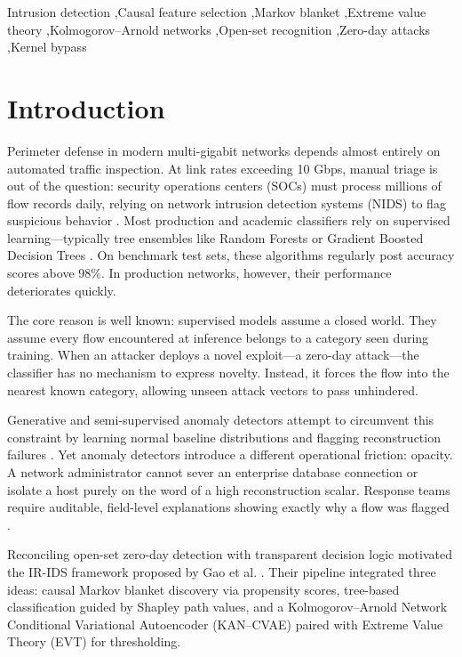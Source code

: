 \documentclass[5p,times,twocolumn]{elsarticle}
\begin{document}
\begin{frontmatter}
\begin{keyword}
Intrusion detection \sep Causal feature selection \sep Markov blanket \sep Extreme value theory \sep Kolmogorov--Arnold networks \sep Open-set recognition \sep Zero-day attacks \sep Kernel bypass
\end{keyword}

\end{frontmatter}

\section{Introduction}
Perimeter defense in modern multi-gigabit networks depends almost entirely on automated traffic inspection. At link rates exceeding 10 Gbps, manual triage is out of the question: security operations centers (SOCs) must process millions of flow records daily, relying on network intrusion detection systems (NIDS) to flag suspicious behavior \cite{viegas2021machine, ning2021}. Most production and academic classifiers rely on supervised learning—typically tree ensembles like Random Forests or Gradient Boosted Decision Trees \cite{pajouh2019, mohiuddin2023}. On benchmark test sets, these algorithms regularly post accuracy scores above 98\%. In production networks, however, their performance deteriorates quickly.

The core reason is well known: supervised models assume a closed world. They assume every flow encountered at inference belongs to a category seen during training. When an attacker deploys a novel exploit—a zero-day attack—the classifier has no mechanism to express novelty. Instead, it forces the flow into the nearest known category, allowing unseen attack vectors to pass unhindered.

Generative and semi-supervised anomaly detectors attempt to circumvent this constraint by learning normal baseline distributions and flagging reconstruction failures \cite{shone2018, yue2022, wu2023}. Yet anomaly detectors introduce a different operational friction: opacity. A network administrator cannot sever an enterprise database connection or isolate a host purely on the word of a high reconstruction scalar. Response teams require auditable, field-level explanations showing exactly why a flow was flagged \cite{lipton2018, pai2024}.

Reconciling open-set zero-day detection with transparent decision logic motivated the IR-IDS framework proposed by Gao et al. \cite{gao2025irids}. Their pipeline integrated three ideas: causal Markov blanket discovery via propensity scores, tree-based classification guided by Shapley path values, and a Kolmogorov--Arnold Network Conditional Variational Autoencoder (KAN--CVAE) paired with Extreme Value Theory (EVT) for thresholding.
\end{document}
